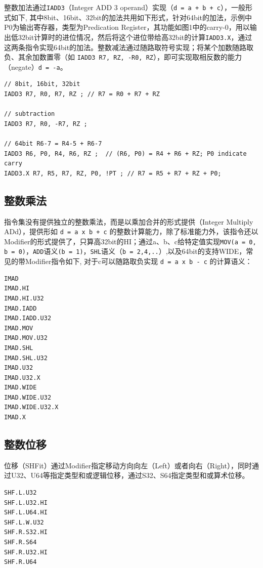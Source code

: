 整数加法通过\lstinline|IADD3|（Integer ADD 3 operand）实现（\lstinline|d = a + b + c|），一般形式如下, 其中8bit、16bit、32bit的加法共用如下形式，针对64bit的加法，示例中P0为输出寄存器，类型为Predication Register，其功能如图1中的carry-0，用以输出低32bit计算时的进位情况，然后将这个进位带给高32bit的计算\lstinline|IADD3.X|，通过这两条指令实现64bit的加法。整数减法通过随路取符号实现；将某个加数随路取负、其余加数置零（如 \lstinline|IADD3 R7, RZ, -R0, RZ|），即可实现取相反数的能力（negate）\lstinline|d = -a|。

\begin{lstlisting}
// 8bit, 16bit, 32bit
IADD3 R7, R0, R7, RZ ; // R7 = R0 + R7 + RZ

// subtraction
IADD3 R7, R0, -R7, RZ ;

// 64bit R6-7 = R4-5 + R6-7
IADD3 R6, P0, R4, R6, RZ ;  // (R6, P0) = R4 + R6 + RZ; P0 indicate carry
IADD3.X R7, R5, R7, RZ, P0, !PT ; // R7 = R5 + R7 + RZ + P0;
\end{lstlisting}

\subsection{整数乘法}

指令集没有提供独立的整数乘法，而是以乘加合并的形式提供（Integer Multiply ADd），提供形如 \lstinline|d = a x b + c| 的整数计算能力，除了标准能力外，该指令还以Modifier的形式提供了，只算高32bit的HI；通过a、b、c给特定值实现\lstinline|MOV(a = 0, b = 0)|，\lstinline|ADD|语义\lstinline|(b = 1)|，\lstinline|SHL|语义（\lstinline|b = 2,4,..|）,以及64bit的支持WIDE，常见的带Modifier指令如下, 对于c可以随路取负实现 \lstinline|d = a x b - c| 的计算语义：

\begin{lstlisting}
IMAD
IMAD.HI
IMAD.HI.U32
IMAD.IADD
IMAD.IADD.U32
IMAD.MOV
IMAD.MOV.U32
IMAD.SHL
IMAD.SHL.U32
IMAD.U32
IMAD.U32.X
IMAD.WIDE
IMAD.WIDE.U32
IMAD.WIDE.U32.X
IMAD.X
\end{lstlisting}

\subsection{整数位移}

位移（SHFit）通过Modifier指定移动方向向左（Left）或者向右（Right），同时通过U32、U64等指定类型和或逻辑位移，通过S32、S64指定类型和或算术位移。

\begin{lstlisting}
SHF.L.U32
SHF.L.U32.HI
SHF.L.U64.HI
SHF.L.W.U32
SHF.R.S32.HI
SHF.R.S64
SHF.R.U32.HI
SHF.R.U64
\end{lstlisting}

